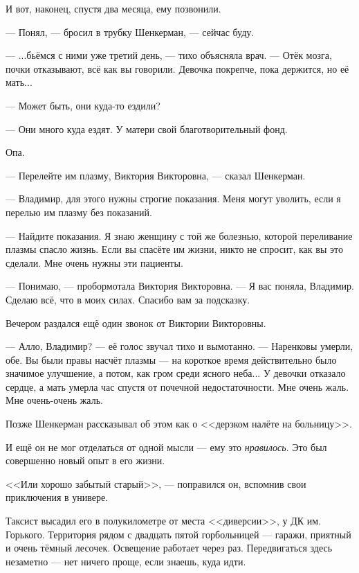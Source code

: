 И вот, наконец, спустя два месяца, ему позвонили.

--- Понял, --- бросил в трубку Шенкерман, --- сейчас буду.

--- ...бьёмся с ними уже третий день, --- тихо объясняла врач.
--- Отёк мозга, почки отказывают, всё как вы говорили.
Девочка покрепче, пока держится, но её мать...

--- Может быть, они куда-то ездили?

--- Они много куда ездят.
У матери свой благотворительный фонд.

Опа.

--- Перелейте им плазму, Виктория Викторовна, --- сказал Шенкерман.

--- Владимир, для этого нужны строгие показания.
Меня могут уволить, если я перелью им плазму без показаний.

--- Найдите показания.
Я знаю женщину с той же болезнью, которой переливание плазмы спасло жизнь.
Если вы спасёте им жизни, никто не спросит, как вы это сделали.
Мне очень нужны эти пациенты.

--- Понимаю, --- пробормотала Виктория Викторовна.
--- Я вас поняла, Владимир.
Сделаю всё, что в моих силах.
Спасибо вам за подсказку.

Вечером раздался ещё один звонок от Виктории Викторовны.

--- Алло, Владимир? --- её голос звучал тихо и вымотанно.
--- Наренковы умерли, обе.
Вы были правы насчёт плазмы --- на короткое время действительно было значимое улучшение, а потом, как гром среди ясного неба...
У девочки отказало сердце, а мать умерла час спустя от почечной недостаточности.
Мне очень жаль.
Мне очень-очень жаль.

\asterism

\textspace

Позже Шенкерман рассказывал об этом как о <<дерзком налёте на больницу>>.

\textspace

И ещё он не мог отделаться от одной мысли --- ему это \emph{нравилось}.
Это был совершенно новый опыт в его жизни.

<<Или хорошо забытый старый>>, --- поправился он, вспомнив свои приключения в универе.

Таксист высадил его в полукилометре от места <<диверсии>>, у ДК им. Горького.
Территория рядом с двадцать пятой горбольницей --- гаражи, приятный и очень тёмный лесочек.
Освещение работает через раз.
Передвигаться здесь незаметно --- нет ничего проще, если знаешь, куда идти.

